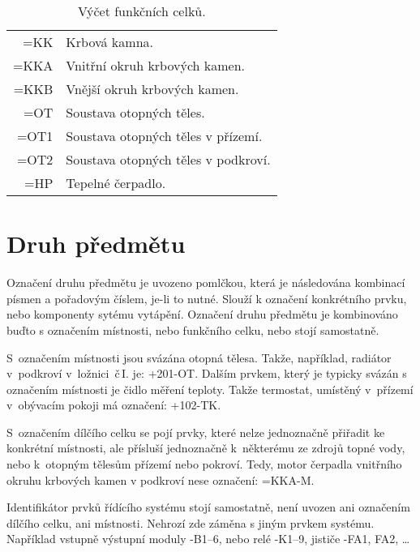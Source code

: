 \documentclass[a4paper,draft]{book}
\begin{document}
    \begin{table}[h]
        \centering
        \begin{tabular}{r|l}
        =KK & Krbová kamna.\\
        =KKA & Vnitřní okruh krbových kamen.\\
        =KKB & Vnější okruh krbových kamen.\\
        =OT & Soustava otopných těles.\\
        =OT1 & Soustava otopných těles v přízemí.\\
        =OT2 & Soustava otopných těles v podkroví.\\
        =HP & Tepelné čerpadlo.\\
        \end{tabular}
    \caption{Výčet funkčních celků.}
    \label{tab:funkcni-celky}
    \end{table}

\section{Druh předmětu}

    Označení druhu předmětu je uvozeno pomlčkou, která je následována
    kombinací písmen a pořadovým číslem, je-li to nutné. Slouží k označení
    konkrétního prvku, nebo komponenty sytému vytápění. Označení druhu
    předmětu je kombinováno buďto s označením místnosti, nebo funkčního
    celku, nebo stojí samostatně.

    S~označením místnosti jsou svázána otopná tělesa. Takže, například,
    radiátor v~podkroví v~ložnici~č\,I. je: +201-OT. Dalším prvkem, který
    je typicky svázán s označením místnosti je čidlo měření teploty. Takže
    termostat, umístěný v~přízemí v~obývacím pokoji má označení: +102-TK.

    S~označením dílčího celku se pojí prvky, které nelze jednoznačně přiřadit
    ke konkrétní místnosti, ale přísluší jednoznačně k~některému ze zdrojů
    topné vody, nebo k~otopným tělesům přízemí nebo pokroví. Tedy, motor
    čerpadla vnitřního okruhu krbových kamen v podkroví nese označení:
    =KKA-M.

    Identifikátor prvků řídícího systému stojí samostatně, není uvozen
    ani označením dílčího celku, ani místnosti. Nehrozí zde záměna
    s jiným prvkem systému. Například vstupně výstupní moduly -B1--6,
    nebo relé -K1--9, jističe -FA1, FA2, \ldots

    
\end{document}
